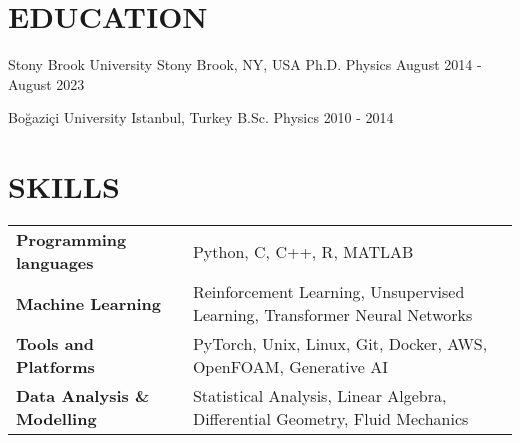 \documentclass[letterpaper,11pt]{article}
\begin{document}
\section{EDUCATION}
\resumeSubHeadingListStart
\resumeSubheading
{Stony Brook University}
{Stony Brook, NY, USA}
{Ph.D. Physics}
{August 2014 - August 2023}
\resumeItemListStart
{}
\resumeItemListEnd

\vspace{-4pt}

\resumeSubheading
{Boğaziçi University}
{Istanbul, Turkey}
{B.Sc. Physics}
{2010 - 2014}
\resumeItemListStart
{}
\resumeItemListEnd

\resumeSubHeadingListEnd
\vspace{-10pt}
\section{SKILLS}

\begin{multicols}{2}
  \begin{tabular}{ p{5.4cm} p{14.3cm}}
    \textbf{Programming languages}    & Python, C, C++, R, MATLAB \\
    \textbf{Machine Learning}         & Reinforcement Learning,
    Unsupervised Learning, Transformer Neural Networks \\
    \textbf{Tools and Platforms}         & PyTorch, Unix, Linux, Git,
    Docker, AWS, OpenFOAM, Generative AI \\
    \textbf{Data Analysis \& Modelling}         & Statistical
    Analysis, Linear Algebra, Differential Geometry, Fluid Mechanics \\
  \end{tabular}
\end{multicols}

%
\printbibliography[title = PUBLICATIONS]
\vspace{-8pt}
\end{document}
